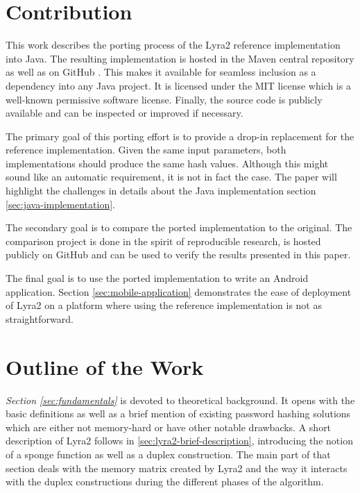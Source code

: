 \section{Contribution}
This work describes the porting process of the Lyra2 reference implementation into Java. The resulting implementation is hosted in the Maven central repository \cite{maven:2017:lyra2} as well as on GitHub \cite{github:2017:lyra2-java}. This makes it available for seamless inclusion as a dependency into any Java project. It is licensed under the MIT license which is a well-known permissive software license. Finally, the source code is publicly available and can be inspected or improved if necessary.

The primary goal of this porting effort is to provide a drop-in replacement for the reference implementation. Given the same input parameters, both implementations should produce the same hash values. Although this might sound like an automatic requirement, it is not in fact the case. The paper will highlight the challenges in details about the Java implementation section \ref{sec:java-implementation}.

The secondary goal is to compare the ported implementation to the original. The comparison project is done in the spirit of reproducible research, is hosted publicly on GitHub \cite{github:2017:lyra2-compare} and can be used to verify the results presented in this paper.

The final goal is to use the ported implementation to write an Android application. Section \ref{sec:mobile-application} demonstrates the ease of deployment of Lyra2 on a platform where using the reference implementation is not as straightforward.

\section{Outline of the Work}

\emph{Section \ref{sec:fundamentals}} is devoted to theoretical background. It opens with the basic definitions as well as a brief mention of existing password hashing solutions which are either not memory-hard or have other notable drawbacks. A short description of Lyra2 follows in \ref{sec:lyra2-brief-description}, introducing the notion of a sponge function as well as a duplex construction. The main part of that section deals with the memory matrix created by Lyra2 and the way it interacts with the duplex constructions during the different phases of the algorithm.


